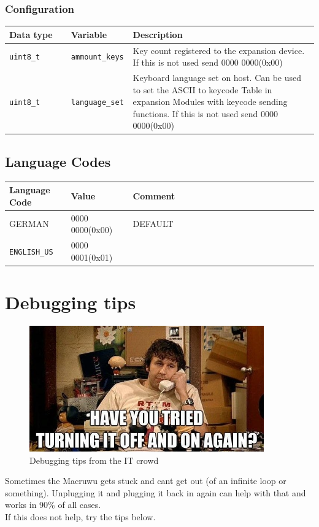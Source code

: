 \documentclass[english, 12pt]{scrartcl}
\begin{document}
	\subsubsection{Configuration}
	\label{Config}
	\begin{center}
		\begin{tabular}{|m{0.2\linewidth}|m{0.2\linewidth}|m{0.6\linewidth}|}
			\hline
			Data type&Variable&Description\\
			\hline
			\verb=uint8_t=&\verb=ammount_keys=&Key count registered to the expansion device. If this is not used send 0000 0000(0x00)\\
			\hline
			\verb=uint8_t=&\verb=language_set=&Keyboard language set on host. Can be used to set the ASCII to keycode Table in expansion Modules with keycode sending functions. If this is not used send 0000 0000(0x00)\\
			\hline
		\end{tabular}
	\end{center}

	\subsection{Language Codes}
	\begin{center}
		\begin{tabular}{|m{0.2\linewidth}|m{0.2\linewidth}|m{0.6\linewidth}|}
			\hline
			Language Code&Value&Comment\\
			\hline
			GERMAN&0000 0000(0x00)&DEFAULT\\
			\hline
			\verb=ENGLISH_US=&0000 0001(0x01)&\\
			\hline
		\end{tabular}
	\end{center}

	\section{Debugging tips}
	\begin{figure}[H]
		\centering
		\includegraphics[width=0.9\textwidth]{debugging}
		\caption{Debugging tips from the IT crowd}
	\end{figure}
	Sometimes the Macruwu gets stuck and cant get out (of an infinite loop or something). Unplugging it and plugging it back in again can help with that and works in 90\% of all cases.\\
	If this does not help, try the tips below.
\end{document}
